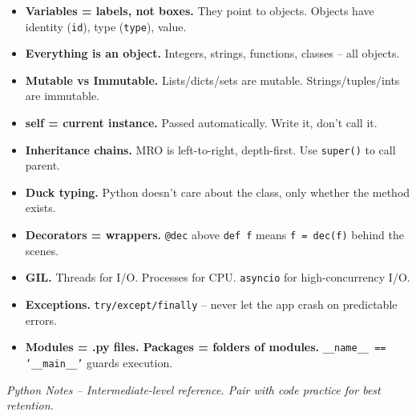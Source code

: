 \documentclass[12pt,a4paper]{article}
\newcommand{\code}[1]{\texttt{\small\color{pyblue}#1}}
\begin{document}
\begin{summarybox}
\begin{itemize}
  \item \textbf{Variables = labels, not boxes.} They point to objects. Objects have identity (\code{id}), type (\code{type}), value.
  \item \textbf{Everything is an object.} Integers, strings, functions, classes -- all objects.
  \item \textbf{Mutable vs Immutable.} Lists/dicts/sets are mutable. Strings/tuples/ints are immutable.
  \item \textbf{self = current instance.} Passed automatically. Write it, don't call it.
  \item \textbf{Inheritance chains.} MRO is left-to-right, depth-first. Use \code{super()} to call parent.
  \item \textbf{Duck typing.} Python doesn't care about the class, only whether the method exists.
  \item \textbf{Decorators = wrappers.} \code{@dec} above \code{def f} means \code{f = dec(f)} behind the scenes.
  \item \textbf{GIL.} Threads for I/O. Processes for CPU. \code{asyncio} for high-concurrency I/O.
  \item \textbf{Exceptions.} \code{try/except/finally} -- never let the app crash on predictable errors.
  \item \textbf{Modules = .py files. Packages = folders of modules.} \code{\_\_name\_\_ == '\_\_main\_\_'} guards execution.
\end{itemize}
\end{summarybox}

\vfill
\begin{center}
{\small\color{gray}\itshape Python Notes -- Intermediate-level reference. Pair with code practice for best retention.}
\end{center}
\end{document}
